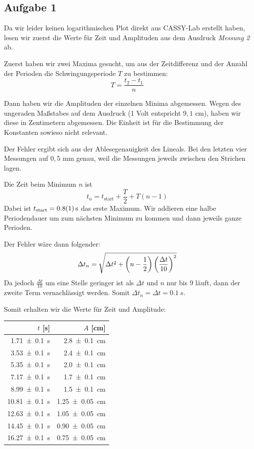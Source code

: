 \documentclass[a4paper,german,12pt,smallheadings]{scrartcl}
\begin{document}
\subsection{Aufgabe 1}
Da wir leider keinen logarithmischen Plot direkt aus CASSY-Lab erstellt haben,
lesen wir zuerst die Werte für Zeit und Amplituden aus dem Ausdruck
\textit{Messung 2} ab.

Zuerst haben wir zwei Maxima gesucht, um aus der Zeitdifferenz und der Anzahl
der Perioden die Schwingungsperiode $T$ zu bestimmen:
\begin{equation}
  T = \frac{t_2 - t_1}{n}
\end{equation}

Dann haben wir die Amplituden der einzelnen Minima abgemessen.  Wegen des
ungeraden Maßstabes auf dem Ausdruck (1 Volt entspricht $9{,}1$ cm), haben wir
diese in Zentimetern abgemessen. Die Einheit ist für die Bestimmung der
Konstanten sowieso nicht relevant.

Der Fehler ergibt sich aus der Ablesegenauigkeit des Lineals. Bei den letzten
vier Messungen auf $0{,}5$ mm genau, weil die Messungen jeweils zwischen
den Strichen lagen.

Die Zeit beim Minimum $n$ ist
\begin{equation}
  t_n = t_\text{start} + \frac{T}{2} + T(n-1)
\end{equation}
Dabei ist $t_\text{start} = \SI{0.8+-0.1}{s}$ das erste Maximum. Wir addieren
eine halbe Periodendauer um zum nächsten Minimum zu kommen und dann jeweils
ganze Perioden.

Der Fehler wäre dann folgender:
\begin{equation}
  \Delta t_n = \sqrt{\Delta t^2 + \del{n- \frac{1}{2}} \del{\frac{\Delta t}{10}}^2}
\end{equation}
Da jedoch $\frac{\Delta t}{10}$ um eine Stelle geringer ist als $\Delta t$ und
$n$ nur bis 9 läuft, dann der zweite Term vernachlässigt werden. Somit
$\Delta t_n = \Delta t = \SI{0.1}{s}$.

Somit erhalten wir die Werte für Zeit und Amplitude:

\begin{tabular}{r|r}
  $t$ [s] & $A$ [cm] \\
  \hline
  \SI{ 1.71+-0.1}{s} & \SI{ 2.8+-0.1 }{cm} \\
  \SI{ 3.53+-0.1}{s} & \SI{ 2.4+-0.1 }{cm} \\
  \SI{ 5.35+-0.1}{s} & \SI{ 2,0+-0.1 }{cm} \\
  \SI{ 7.17+-0.1}{s} & \SI{ 1.7+-0.1 }{cm} \\
  \SI{ 8.99+-0.1}{s} & \SI{ 1.5+-0.1 }{cm} \\
  \SI{10.81+-0.1}{s} & \SI{1.25+-0.05}{cm} \\
  \SI{12.63+-0.1}{s} & \SI{1.05+-0.05}{cm} \\
  \SI{14.45+-0.1}{s} & \SI{0.90+-0.05}{cm} \\
  \SI{16.27+-0.1}{s} & \SI{0.75+-0.05}{cm} \\
\end{tabular}
\end{document}
